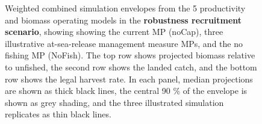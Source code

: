 \documentclass[11pt]{book}
\begin{document}
\begin{landscape}
\begin{figure}[htb]
{\centering {} 

}

\caption{Weighted combined simulation envelopes from the 5 productivity and biomass operating models in the \textbf{robustness recruitment scenario}, showing showing the current MP (noCap), three illustrative at-sea-release management measure MPs, and the no fishing MP (NoFish). The top row shows projected biomass relative to unfished, the second row shows the landed catch, and the bottom row shows the legal harvest rate. In each panel, median projections are shown as thick black lines, the central 90 \% of the envelope is shown as grey shading, and the three illustrated simulation replicates as thin black lines.}\label{fig:unnamed-chunk-24}
\end{figure}
\end{landscape}
\MakeAvailable
\end{document}
